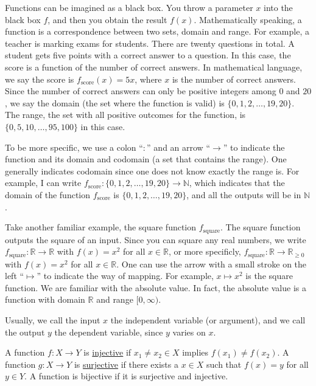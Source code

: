 \documentclass[11pt]{book}
\theoremstyle{break}
\theoremstyle{no_label}
\newcommand{\bbR}{\mathbb{R}}
\newcommand{\bbN}{\mathbb{N}}
\numberwithin{equation}{section}
\begin{document}
Functions can be imagined as a black box. You throw a parameter $x$ into the black box $f$, and then you obtain the result $f(x)$. Mathematically speaking, a function is a correspondence between two sets, domain and range. For example, a teacher is marking exams for students. There are twenty questions in total. A student gets five points with a correct answer to a question. In this case, the score is a function of the number of correct answers. In mathematical language, we say the score is $f_{\text{score}}(x)=5x$, where $x$ is the number of correct answers. Since the number of correct answers can only be positive integers among $0$ and $20$, we say the domain (the set where the function is valid) is $\{0, 1, 2, \dots, 19, 20\}$. The range, the set with all positive outcomes for the function, is $\{0, 5, 10, \dots, 95, 100\}$ in this case.

To be more specific, we use a colon ``$:$'' and an arrow ``$\to$'' to indicate the function and its domain and codomain (a set that contains the range). One generally indicates codomain since one does not know exactly the range is. For example, I can write $f_{\text{score}}:\{0, 1, 2, \dots, 19, 20\}\to\bbN$, which indicates that the domain of the function $f_{\text{score}}$ is $\{0, 1, 2, \dots, 19, 20\}$, and all the outputs will be in $\bbN$.

Take another familiar example, the square function $f_{\text{square}}$. The square function outputs the square of an input. Since you can square any real numbers, we write $f_{\text{square}}:\bbR\to\bbR$ with $f(x)=x^2$ for all $x\in\bbR$, or more specificly, $f_{\text{square}}:\bbR\to\bbR_{\geq0}$ with $f(x)=x^2$ for all $x\in\bbR$. One can use the arrow with a small stroke on the left ``$\mapsto$'' to indicate the way of mapping. For example, $x\mapsto x^2$ is the square function. We are familiar with the absolute value. In fact, the absolute value is a function with domain $\bbR$ and range $[0, \infty)$.

Usually, we call the input $x$ the independent variable (or argument), and we call the output $y$ the dependent variable, since $y$ varies on $x$.

\begin{definition}
    A function $f:X\to Y$ is \underline{injective} if $x_1\ne x_2\in X$ implies $f(x_1)\ne f(x_2)$. A function $g:X\to Y$ is \underline{surjective} if there exists a $x\in X$ such that $f(x)=y$ for all $y\in Y$. A function is bijective if it is surjective and injective.
\end{definition}
\end{document}
